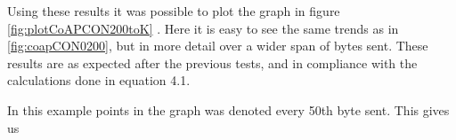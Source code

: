 \noindent Using these results it was possible to plot the graph in figure \ref{fig:plotCoAPCON200toK} . Here it is easy to see the same trends as in  \ref{fig:coapCON0200}, but in more detail over a wider span of bytes sent. These results are as expected after the previous tests, and in compliance with the calculations done in equation 4.1. 

\noindent In this example points in the graph was denoted every 50th byte sent. This gives us 



 



